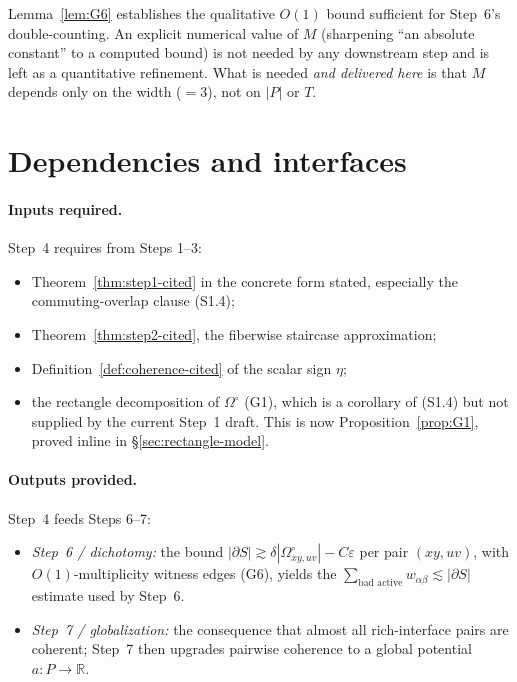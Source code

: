 \begin{remark}
Lemma~\ref{lem:G6} establishes the qualitative $O(1)$ bound sufficient for
Step~6's double-counting. An explicit numerical value of $M$ (sharpening
``an absolute constant'' to a computed bound) is not needed by any
downstream step and is left as a quantitative refinement. What is needed
\emph{and delivered here} is that $M$ depends only on the width
($=3$), not on $|P|$ or $T$.
\end{remark}

\section{Dependencies and interfaces}
\label{sec:deps}

\paragraph{Inputs required.} Step~4 requires from Steps 1--3:
\begin{itemize}
\item Theorem~\ref{thm:step1-cited} in the concrete form stated, especially
the commuting-overlap clause (S1.4);
\item Theorem~\ref{thm:step2-cited}, the fiberwise staircase approximation;
\item Definition~\ref{def:coherence-cited} of the scalar sign $\eta$;
\item the rectangle decomposition of $\Omega^\circ$ (G1), which is a
corollary of (S1.4) but not supplied by the current Step~1 draft.
This is now Proposition~\ref{prop:G1}, proved inline in
\S\ref{sec:rectangle-model}.
\end{itemize}

\paragraph{Outputs provided.} Step~4 feeds Steps 6--7:
\begin{itemize}
\item \emph{Step~6 / dichotomy:} the bound
$|\partial S|\gtrsim\delta|\Omega^\circ_{xy,uv}|-C\varepsilon$ per pair
$(xy,uv)$, with $O(1)$-multiplicity witness edges (G6), yields the
$\sum_{\text{bad active}} w_{\alpha\beta}\lesssim|\partial S|$ estimate
used by Step~6.
\item \emph{Step~7 / globalization:} the consequence that almost all
rich-interface pairs are coherent; Step~7 then upgrades pairwise
coherence to a global potential $a\colon P\to\mathbb R$.
\end{itemize}

